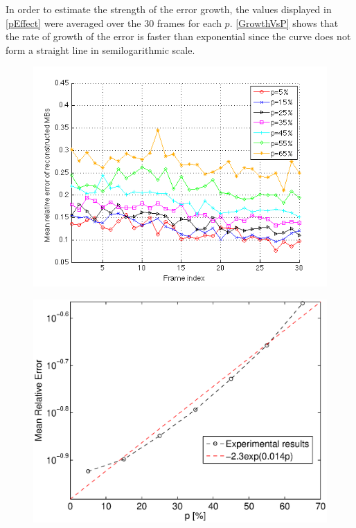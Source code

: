 \documentclass[a4paper, 11pt]{article} %
\begin{document}
In order to estimate the strength of the error growth, the values displayed in \autoref{pEffect} were averaged over the 30 frames for each $p$. \autoref{GrowthVsP} shows that the rate of growth of the error is faster than exponential since the curve does not form a straight line in semilogarithmic scale.
\begin{figure}[h!]
\centering
\includegraphics[scale=0.5]{pEffect}
\caption{\label{pEffect}}
\end{figure}

\begin{figure}[h!]
\centering
\includegraphics[scale=0.45]{GrowthVsP.eps}
\caption{\label{GrowthVsP}}
\end{figure}
\end{document}
